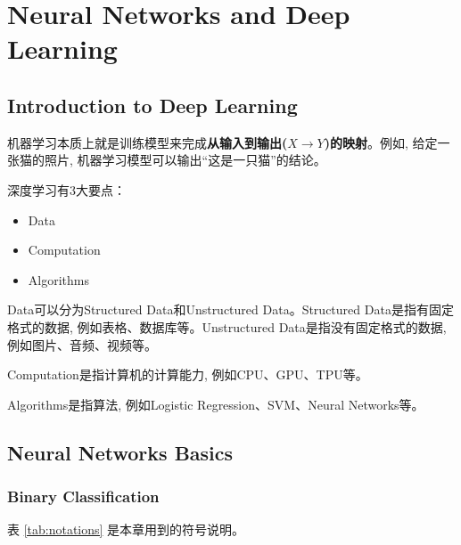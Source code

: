 \chapter{Neural Networks and Deep Learning}

\section{Introduction to Deep Learning}
机器学习本质上就是训练模型来完成\textbf{从输入到输出($X\to Y$)的映射}。例如, 给定一张猫的照片, 机器学习模型可以输出``这是一只猫''的结论。

\vspace{0.5\baselineskip} %

深度学习有3大要点：
\begin{itemize}	
	\item Data
	\item Computation
	\item Algorithms
\end{itemize}

Data可以分为Structured Data和Unstructured Data。Structured Data是指有固定格式的数据, 例如表格、数据库等。Unstructured Data是指没有固定格式的数据, 例如图片、音频、视频等。

Computation是指计算机的计算能力, 例如CPU、GPU、TPU等。

Algorithms是指算法, 例如Logistic Regression、SVM、Neural Networks等。

\section{Neural Networks Basics}

\subsection{Binary Classification}

表 \ref{tab:notations} 是本章用到的符号说明。

